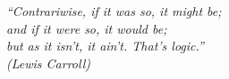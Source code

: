 \begin{epigrafe}
    \vspace*{\fill}
	\begin{flushright}
		\textit{``Contrariwise, if it was so, it might be;\\ and if it were so, it would be;\\ but as it isn't, it ain't. That's logic.''\\
		(Lewis Carroll)}
	\end{flushright}
\end{epigrafe}